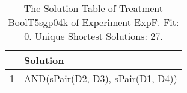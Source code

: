 \begin{table}[ht]
\centering
\begin{tabular}{rp{9cm}}
  \hline
 & Solution \\ 
  \hline
1 & AND(sPair(D2, D3), sPair(D1, D4)) \\ 
   \hline
\end{tabular}
\caption{The Solution Table of Treatment BoolT5sgp04k of Experiment ExpF. Fit: 0. Unique Shortest Solutions: 27.} 
\end{table}

